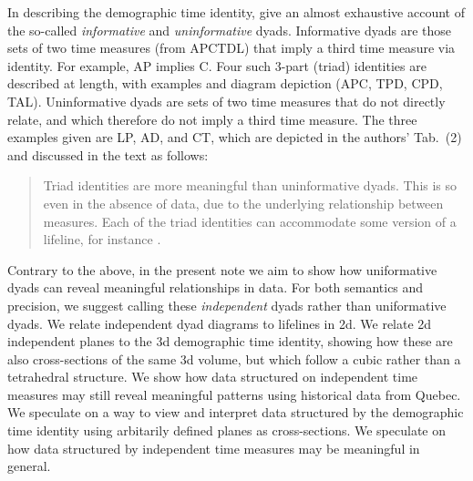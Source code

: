 In describing the demographic time identity, \citet{riffe2017demographictime} give an almost exhaustive account of the so-called \emph{informative} and \emph{uninformative} dyads. Informative dyads are those sets of two time measures (from APCTDL) that imply a third time measure via identity. For example, AP implies C. Four such 3-part (triad) identities are described at length, with examples and diagram depiction (APC, TPD, CPD, TAL). Uninformative dyads are sets of two time measures that do not directly relate, and which therefore do not imply a third time measure. The three examples given are LP, AD, and CT, which are depicted in the authors' Tab.~(2) and discussed in the text as follows:
\begin{quote}
Triad identities are more meaningful than uninformative dyads. This is so even in the absence of data, due to the underlying relationship between measures. Each of the triad identities can accommodate some version of a lifeline, for instance \citep[p5][]{riffe2017demographictime}. 
\end{quote}

Contrary to the above, in the present note we aim to show how uniformative dyads can reveal meaningful relationships in data. For both semantics and precision, we suggest calling these \emph{independent} dyads rather than uniformative dyads. We relate independent dyad diagrams to lifelines in 2d. We relate 2d independent planes to the 3d demographic time identity, showing how these are also cross-sections of the same 3d volume, but which follow a cubic rather than a tetrahedral structure. We show how data structured on independent time measures may still reveal meaningful patterns using historical data from Quebec. We speculate on a way to view and interpret data structured by the demographic time identity using arbitarily defined planes as cross-sections. We speculate on how data structured by independent time measures may be meaningful in general.


